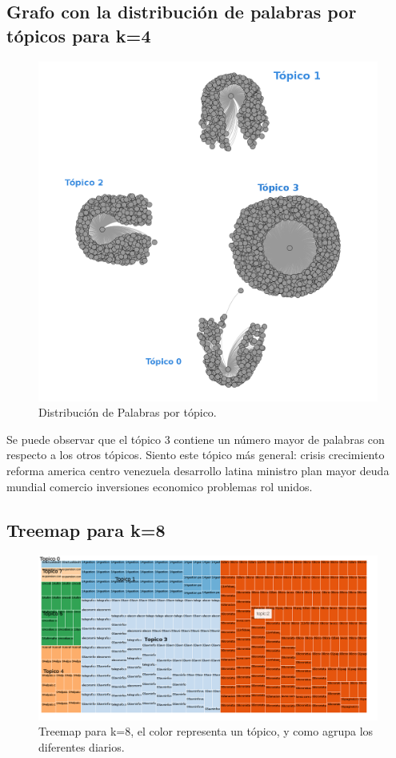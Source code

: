 \documentclass[8.5pt,twoside,twocolumn]{article}
\begin{document}
\subsection{ Grafo con la distribuci\'on de palabras por t\'opicos para k=4  }
\begin{figure}[h]
  \centering
  \includegraphics[scale=0.2]{topics_words_4_10_txt.png}
  \caption{Distribuci\'on de Palabras por t\'opico.}  
  \label{fgr:perplexity}
\end{figure}

Se puede observar que el t\'opico 3 contiene un n\'umero mayor de palabras con respecto a los otros t\'opicos.
Siento este t\'opico m\'as general: crisis crecimiento reforma america centro venezuela desarrollo latina 
ministro plan mayor deuda mundial comercio inversiones economico problemas rol unidos.

\subsection{ Treemap para k=8  }
\begin{figure}[h]
  \centering
  \includegraphics[scale=0.2]{tremap_k8_5_P0_998_unigram.png}
  \caption{Treemap para k=8, el color representa un t\'opico, y como agrupa los diferentes diarios.}  
  \label{fgr:perplexity}
\end{figure}
\end{document}
